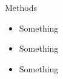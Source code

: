 
\begin{frame}{Methods}
	\begin{itemize}
		\item Something
		\item Something
		\item Something
	\end{itemize}

\end{frame}